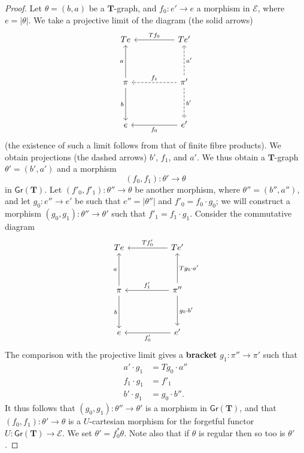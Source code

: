\documentclass{article}
\newcommand{\oldpage}[1]{\marginpar{\footnotesize$\Big\vert$ \textit{p.~#1}}}
\newcommand{\unsure}[1]{{\color{purple}\textbf{#1}}}
\newcommand{\TT}{\mathbf{T}}
\newcommand{\cat}[1]{\mathcal{#1}}
\newcommand{\Cat}[1]{\mathsf{#1}}
\newcommand{\set}[1]{|#1|}
\newcommand{\Gr}[1]{\Cat{Gr}(#1)}
\begin{document}
\begin{proof}
  Let $\theta=(b,a)$ be a $\TT$-graph, and $f_0\colon e'\to e$ a morphism in $\cat{E}$, where $e=\set{\theta}$.
  We take a projective limit of the diagram (the solid arrows)
  \[
    \begin{tikzcd}[sep=huge]
      Te
    & Te'
        \ar[l,swap,"Tf_0"]
    \\\pi
        \ar[u,"a"]
        \ar[d,swap,"b"]
    & \pi'
        \ar[u,dashed,swap,"a'"]
        \ar[l,dashed,swap,"f_1"]
        \ar[d,dashed,"b'"]
    \\e
    & e'
        \ar[l,"f_0"]
    \end{tikzcd}
  \]
  (the existence of such a limit follows from that of finite fibre products).
  We obtain projections (the dashed arrows) $b'$, $f_1$, and $a'$.
  We thus obtain a $\TT$-graph $\theta'=(b',a')$ and a morphism
  \[
    (f_0,f_1)\colon\theta'\to\theta
  \]
  in $\Gr{\TT}$.
  Let $(f'_0,f'_1)\colon\theta''\to\theta$ be another morphism, where $\theta''=(b'',a'')$, and let $g_0\colon e''\to e'$ be such that $e''=\set{\theta''}$ and $f'_0=f_0\cdot g_0$;
  we will construct a morphism $(g_0,g_1)\colon\theta''\to\theta'$ such that $f'_1=f_1\cdot g_1$.
  Consider the commutative diagram
  \[
    \begin{tikzcd}[sep=huge]
      Te
    & Te'
        \ar[l,swap,"Tf'_0"]
    \\\pi
        \ar[u,"a"]
        \ar[d,swap,"b"]
    & \pi''
        \ar[u,swap,"Tg_0\cdot a'"]
        \ar[l,swap,"f'_1"]
        \ar[d,"g_0\cdot b'"]
    \\e
    & e'
        \ar[l,"f'_0"]
    \end{tikzcd}
  \]
  \oldpage{236}
  The comparison with the projective limit gives a \unsure{bracket} $g_1\colon\pi''\to\pi'$ such that
  \[
    \begin{aligned}
      a'\cdot g_1
    & = Tg_0\cdot a''
    \\f_1\cdot g_1
    & = f'_1
    \\b'\cdot g_1
    & = g_0\cdot b''.
    \end{aligned}
  \]
  It thus follows that $(g_0,g_1)\colon\theta''\to\theta'$ is a morphism in $\Gr{\TT}$, and that $(f_0,f_1)\colon\theta'\to\theta$ is a $U$-cartesian morphism for the forgetful functor $U\colon\Gr{\TT}\to\cat{E}$.
  We set $\theta'=f_0^*\theta$.
  Note also that if $\theta$ is regular then so too is $\theta'$.


\end{proof}
\end{document}
